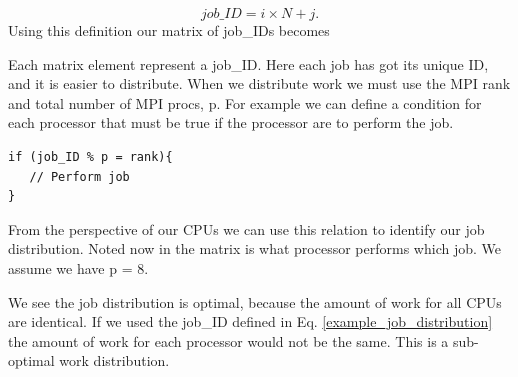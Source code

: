 \documentclass[a4paper,norsk,11pt,twoside]{report}
\begin{document}
\begin{equation}
job\_ID = i \times N + j .
\end{equation}
Using this definition our matrix of job\_IDs becomes

\begin{center}
\end{center}
Each matrix element represent a job\_ID. Here each job has got its unique ID, and it is easier to distribute. When we distribute work we must use the MPI rank and total number of MPI procs, p. For example we can define a condition for each processor that must be true if the processor are to perform the job.

\begin{lstlisting}
if (job_ID % p = rank){
   // Perform job
}
\end{lstlisting}
From the perspective of our CPUs we can use this relation to identify our job distribution. Noted now in the matrix is what processor performs which job. We assume we have p = 8.

\begin{center}
\end{center}
We see the job distribution is optimal, because the amount of work for all CPUs are identical. If we used the job\_ID defined in Eq. \eqref{example_job_distribution} the amount of work for each processor would not be the same. This is a sub-optimal work distribution. 
\end{document}
